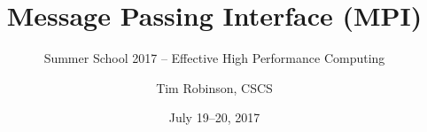 
\newcommand{\SummerSchoolYear}{2017}
\newcommand{\SummerSchoolDate}{July 19--20}
\newcommand{\SummerSchoolAuthor}{Tim Robinson}

\newcommand{\footlinetext}{Summer School \SummerSchoolYear{} -- MPI}

\author{\SummerSchoolAuthor, CSCS}
\title{Message Passing Interface (MPI)}
\subtitle{Summer School \SummerSchoolYear{}  -- Effective High Performance Computing}
\date{\SummerSchoolDate, \SummerSchoolYear}
